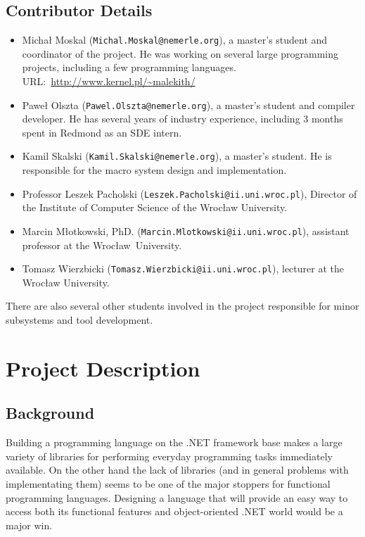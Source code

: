 \documentclass[a4paper,11pt]{article}
\begin{document}
\subsection{Contributor Details}
\begin{itemize}

\item
Micha{\l} Moskal (\texttt{Michal.Moskal@nemerle.org}), a master's
student and coordinator of the project. He was working on several large
programming projects, including a few programming languages.
URL:~\url{http://www.kernel.pl/~malekith/}

\item
Pawe{\l} Olszta (\texttt{Pawel.Olszta@nemerle.org}), a master's student
and compiler developer. He has several years of industry experience, 
including 3 months spent in Redmond as an SDE intern. 

\item
Kamil Skalski (\texttt{Kamil.Skalski@nemerle.org}), a master's student.
He is responsible for the macro system design and implementation.

\item
Professor Leszek Pacholski (\texttt{Leszek.Pacholski@ii.uni.wroc.pl}), 
Director of the Institute of Computer Science of the Wroc\l aw University.

\item
Marcin M\l otkowski, PhD. (\texttt{Marcin.Mlotkowski@ii.uni.wroc.pl}), 
assistant professor at the Wroc\l aw~University.

\item
Tomasz Wierzbicki (\texttt{Tomasz.Wierzbicki@ii.uni.wroc.pl}), 
lecturer at the Wroc\l aw University.

\end{itemize}

There are also several other students involved in the project
responsible for minor subsystems and tool development.


\section{Project Description}

\subsection{Background}
Building a programming language on the .NET framework base makes a large
variety of libraries for performing everyday programming tasks immediately
available. On the other hand the lack of libraries (and in general problems
with implementating them) seems to be one of the major stoppers for functional
programming languages. Designing a language that will provide an easy way
to access both its functional features and object-oriented .NET world
would be a major win.
\end{document}
